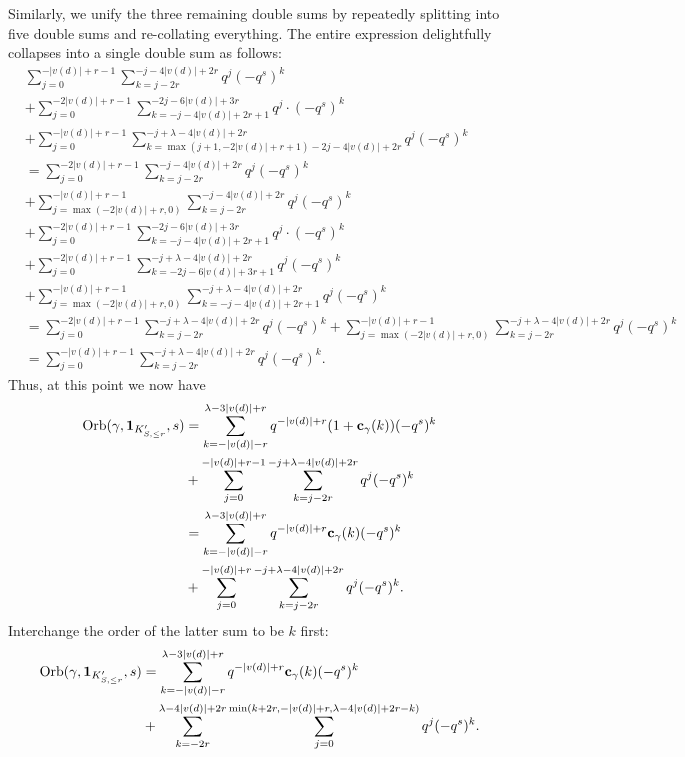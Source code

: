 Similarly, we unify the three remaining double sums by
repeatedly splitting into five double sums and re-collating everything.
The entire expression delightfully collapses into a single double sum as follows:
\begin{align*}
  &\sum_{j=0}^{-|v(d)|+r-1} \sum_{k = j - 2r}^{-j - 4|v(d)| + 2r} q^j (-q^s)^k \\
  &+ \sum_{j=0}^{-2|v(d)|+r-1}
    \sum_{k=-j-4|v(d)|+2r+1}^{-2j-6|v(d)|+3r}
    q^j \cdot (-q^s)^k \\
  &+ \sum_{j=0}^{-|v(d)|+r-1}
    \sum_{k=\max(j+1, -2|v(d)|+r+1) - 2j - 4|v(d)| + 2r}^{-j+\lambda-4|v(d)|+2r}
    q^j (-q^s)^k \\
  &= \sum_{j=0}^{-2|v(d)|+r-1} \sum_{k = j - 2r}^{-j - 4|v(d)| + 2r} q^j (-q^s)^k \\
  &+ \sum_{j=\max(-2|v(d)|+r,0)}^{-|v(d)|+r-1} \sum_{k = j - 2r}^{-j - 4|v(d)| + 2r} q^j (-q^s)^k \\
  &+ \sum_{j=0}^{-2|v(d)|+r-1}
    \sum_{k=-j-4|v(d)|+2r+1}^{-2j-6|v(d)|+3r}
    q^j \cdot (-q^s)^k \\
  &+ \sum_{j=0}^{-2|v(d)|+r-1}
    \sum_{k = -2j - 6|v(d)| + 3r + 1}^{-j+\lambda-4|v(d)|+2r}
    q^j (-q^s)^k \\
  &+ \sum_{j=\max(-2|v(d)|+r, 0)}^{-|v(d)|+r-1}
    \sum_{k = -j - 4|v(d)| + 2r + 1}^{-j+\lambda-4|v(d)|+2r}
    q^j (-q^s)^k \\
  &= \sum_{j=0}^{-2|v(d)|+r-1} \sum_{k = j - 2r}^{-j + \lambda - 4|v(d)| + 2r} q^j (-q^s)^k
    + \sum_{j=\max(-2|v(d)|+r,0)}^{-|v(d)|+r-1} \sum_{k = j - 2r}^{-j + \lambda - 4|v(d)| + 2r} q^j (-q^s)^k \\
  &= \sum_{j=0}^{-|v(d)|+r-1} \sum_{k = j - 2r}^{-j + \lambda - 4|v(d)| + 2r} q^j (-q^s)^k.
\end{align*}
Thus, at this point we now have
\begin{align*}
  \operatorname{Orb}(\gamma, \mathbf{1}_{K'_{S, \le r}}, s)
  &= \sum_{k=-|v(d)|-r}^{\lambda-3|v(d)|+r} q^{-|v(d)|+r} (1+\mathbf c_\gamma(k)) (-q^s)^k \\
  &+ \sum_{j=0}^{-|v(d)|+r-1} \sum_{k = j - 2r}^{-j + \lambda - 4|v(d)| + 2r} q^j (-q^s)^k \\
  &= \sum_{k=-|v(d)|-r}^{\lambda-3|v(d)|+r} q^{-|v(d)|+r} \mathbf c_\gamma(k) (-q^s)^k \\
  &+ \sum_{j=0}^{-|v(d)|+r} \sum_{k = j - 2r}^{-j + \lambda - 4|v(d)| + 2r} q^j (-q^s)^k.
\end{align*}
Interchange the order of the latter sum to be $k$ first:
\begin{align*}
  \operatorname{Orb}(\gamma, \mathbf{1}_{K'_{S, \le r}}, s)
  &= \sum_{k=-|v(d)|-r}^{\lambda-3|v(d)|+r} q^{-|v(d)|+r} \mathbf c_\gamma(k) (-q^s)^k \\
  &+ \sum_{k=-2r}^{\lambda-4|v(d)|+2r} \sum_{j=0}^{\min(k+2r, -|v(d)|+r, \lambda-4|v(d)|+2r-k)} q^j (-q^s)^k.
\end{align*}

